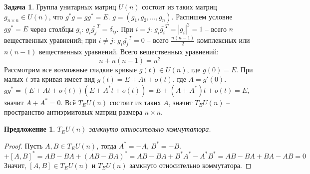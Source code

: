 \documentclass[12pt]{article}
\newtheorem{predl}[theorem]{Предложение}
\theoremstyle{definition}
\newtheorem{zad}{Задача}[section]
\begin{document}
\begin{zad}
Группа унитарных матриц $U(n)$ состоит из таких матриц $g_{n\times n}\in U(n)$, что $g^*g=gg^*=E$. $g=(g_1, g_2,..., g_n)$. Распишем условие $gg^*=E$ через столбцы $g_i$: $g_i\bar{g_j}^T=\delta_{ij}$. При $i=j$: $g_i\bar{g_i}^T=|g_i|^2=1$ -- всего $n$ вещественных уравнений; при $i\neq j$: $g_i\bar{g_j}^T=0$ -- всего $\frac{n(n-1)}{2}$ комплексных или $n(n-1)$ вещественных уравнений. Всего вещественных уравнений:
\begin{equation}
    \boxed{n+n(n-1)=n^2}
\end{equation}
Рассмотрим все возможные гладкие кривые $g(t)\in U(n)$, где $g(0)=E$. При малых $t$ эта кривая имеет вид $g(t)=E+At+o(t)$, где $A=g'(0)$. $gg^*=(E+At+o(t))(E+A^*t+o(t))=E+(A+A^*)t+o(t)=E$, значит $A+A^*=0$. Всё $T_EU(n)$ состоит из таких $A$, значит $T_EU(n)$ -- пространство антиэрмитовых матриц размера $n\times n$.
\begin{predl}
    $T_EU(n)$ замкнуто относительно коммутатора.
\end{predl}
\begin{proof}
    Пусть $A,B\in T_EU(n)$, тогда $A^*=-A$, $B^*=-B$.
    \begin{equation*}
        [A,B]+[A,B]^*=AB-BA+(AB-BA)^*=AB-BA+B^*A^*-A^*B^*=AB-BA+BA-AB=0
    \end{equation*}
    Значит, $[A,B]\in T_EU(n)$ и $T_EU(n)$ замкнуто относительно коммутатора.
\end{proof}
\end{zad}
\end{document}
